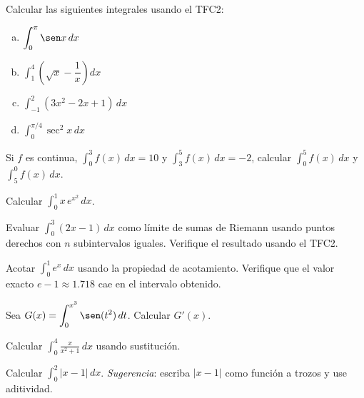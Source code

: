 \begin{prob}
Calcular las siguientes integrales usando el TFC2:
\begin{enumerate}[(a)]
    \item $\displaystyle\int_{0}^{\pi} \sen x\,dx$
    \item $\displaystyle\int_{1}^{4}\!\left(\sqrt{x} - \dfrac{1}{x}\right)dx$
    \item $\displaystyle\int_{-1}^{2}(3x^2 - 2x + 1)\,dx$
    \item $\displaystyle\int_{0}^{\pi/4} \sec^2 x\,dx$
\end{enumerate}
\end{prob}

\begin{prob}
Si $f$ es continua, $\displaystyle\int_{0}^{3} f(x)\,dx = 10$ y $\displaystyle\int_{3}^{5} f(x)\,dx = -2$, calcular $\displaystyle\int_{0}^{5} f(x)\,dx$ y $\displaystyle\int_{5}^{0} f(x)\,dx$.
\end{prob}

\begin{prob}
Calcular $\displaystyle\int_{0}^{1} x\,e^{x^2}\,dx$.
\end{prob}


\begin{prob}
Evaluar $\displaystyle\int_{0}^{3}(2x-1)\,dx$ como límite de sumas de Riemann usando puntos derechos con $n$ subintervalos iguales. Verifique el resultado usando el TFC2.
\end{prob}

\begin{prob}
Acotar $\displaystyle\int_{0}^{1} e^x\,dx$ usando la propiedad de acotamiento. Verifique que el valor exacto $e-1 \approx 1.718$ cae en el intervalo obtenido.
\end{prob}

\begin{prob}
Sea $G(x) = \displaystyle\int_{0}^{x^3} \sen(t^2)\,dt$. Calcular $G'(x)$.
\end{prob}

\begin{prob}
Calcular $\displaystyle\int_{0}^{4} \frac{x}{x^2+1}\,dx$ usando sustitución.
\end{prob}

\begin{prob}
Calcular $\displaystyle\int_{0}^{2} |x-1|\,dx$. \textit{Sugerencia}: escriba $|x-1|$ como función a trozos y use aditividad.
\end{prob}

